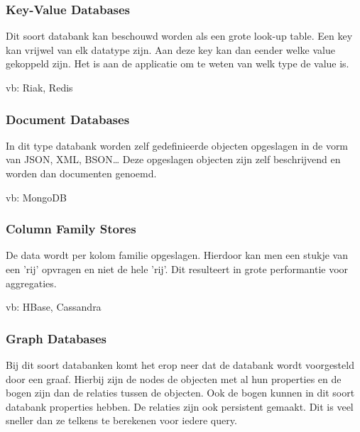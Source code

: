 \documentclass[a4paper,12pt]{article}
\begin{document}
\subsubsection{Key-Value Databases}
Dit soort databank kan beschouwd worden als een grote look-up table.
Een key kan vrijwel van elk datatype zijn.
Aan deze key kan dan eender welke value gekoppeld zijn.
Het is aan de applicatie om te weten van welk type de value is.

vb: Riak, Redis

\subsubsection{Document Databases}
In dit type databank worden zelf gedefinieerde objecten opgeslagen in de vorm van JSON, XML, BSON\ldots
Deze opgeslagen objecten zijn zelf beschrijvend en worden dan documenten genoemd.

vb: MongoDB

\subsubsection{Column Family Stores}
De data wordt per kolom familie opgeslagen.
Hierdoor kan men een stukje van een 'rij' opvragen en niet de hele 'rij'.
Dit resulteert in grote performantie voor aggregaties.

vb: HBase, Cassandra

\subsubsection{Graph Databases}
Bij dit soort databanken komt het erop neer dat de databank wordt voorgesteld door een graaf.
Hierbij zijn de nodes de objecten met al hun properties en de bogen zijn dan de relaties tussen de objecten.
Ook de bogen kunnen in dit soort databank properties hebben.
De relaties zijn ook persistent gemaakt.
Dit is veel sneller dan ze telkens te berekenen voor iedere query.
\end{document}
